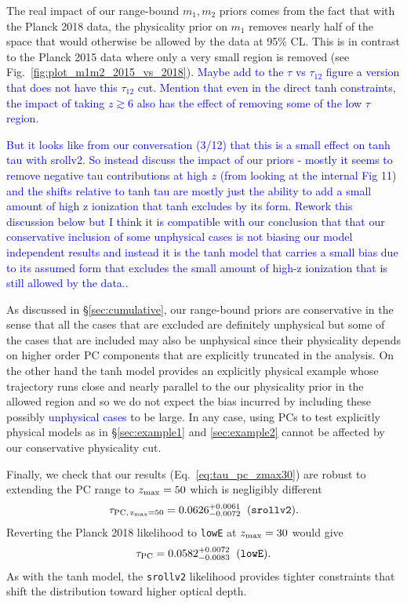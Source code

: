 \documentclass[prd,twocolumn,amsmath,amssymb,floatfix,superscriptaddress,nofootinbib]{revtex4-1}
\newcommand{\zmax}{z_{\rm max}}
\newcommand{\beq}{\begin{equation}}
\newcommand{\eeq}{\end{equation}}
\newcommand{\wh}[1]{\textcolor{blue}{#1}}
\newcommand{\ch}[1]{\textcolor{red}{#1}}
\begin{document}
{The real impact of our range-bound $m_1,m_2$ priors comes from the fact that with the Planck 2018 data, the physicality prior on $m_1$
removes nearly half of the space that would otherwise be allowed by the
data at 95\% CL.  This is in contrast to the Planck 2015 data where only a very small region is removed (see Fig.~\ref{fig:plot_m1m2_2015_vs_2018}).  \wh{Maybe add to the $\tau$ vs $\tau_{12}$ figure a version that does not have this $\tau_{12}$ cut.  Mention that even in the direct tanh constraints, the impact of taking $z\gtrsim 6$ also has the effect of removing some of the low $\tau$ region.}

\wh{But it looks like from our conversation (3/12) that this is a small effect on tanh tau with srollv2.  So instead discuss the impact of our priors - mostly it seems to remove negative tau contributions at high $z$ (from looking at the internal Fig 11) and the shifts relative to tanh tau are mostly just the ability to add a small amount of high z ionization that tanh excludes by its form.  Rework this discussion below but I think it is compatible with our conclusion that that our conservative inclusion of some unphysical cases is not biasing our model independent results and instead it is the tanh model that carries a small bias due to its assumed form that excludes the small amount of high-z ionization that is still allowed by the data.}.

As discussed in \S \ref{sec:cumulative}, our range-bound priors 
are conservative in the sense that all the cases that are excluded are definitely unphysical but some of the cases that are included
may also be unphysical since their physicality depends on higher order PC components that are explicitly truncated in the analysis.  On the other hand the tanh model provides an explicitly physical example whose trajectory runs close  and nearly parallel to the our physicality prior in the allowed region and so we do not expect the bias incurred by 
including these possibly \wh{unphysical cases} to be large. 
In any case, using PCs to 
test explicitly physical models as in \S \ref{sec:example1} and
\ref{sec:example2} cannot be affected by our conservative physicality
cut.

Finally, we check that our results (Eq.~\ref{eq:tau_pc_zmax30}) are robust to
 extending the PC
range to
$z_{\rm max}=50$ which is negligibly different
\beq
\tau_{\rm PC,\, \zmax=50} = 0.0626^{+0.0061}_{-0.0072}\;\; (\texttt{srollv2}).
\eeq
Reverting the Planck 2018 likelihood to \texttt{lowE} at $z_{\rm max}=30$ would give
\beq
\tau_{\rm PC} = 0.0582 ^{+0.0072}_{-0.0083}\;\; (\texttt{lowE}).
\eeq
As with the tanh model, the \texttt{srollv2} likelihood provides tighter constraints that shift the distribution toward higher optical depth.










}
\end{document}
